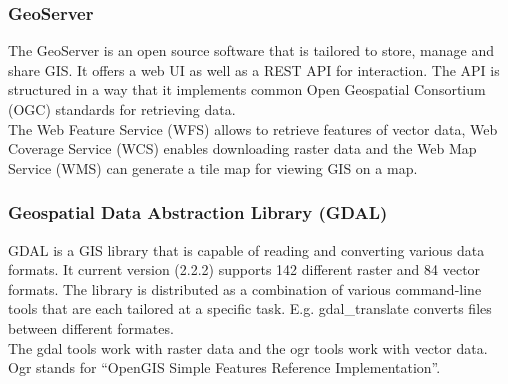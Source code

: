 \subsubsection{GeoServer} \label{sec:GS}
The GeoServer is an open source software that is tailored to store, manage and share GIS. It offers a web UI as well as a REST API for interaction. The API is structured in a way that it implements common Open Geospatial Consortium (OGC) standards for retrieving data.\\
The Web Feature Service (WFS) allows to retrieve features of vector data, Web Coverage Service (WCS) enables downloading raster data and the Web Map Service (WMS) can generate a tile map for viewing GIS on a map.
%

\subsubsection{Geospatial Data Abstraction Library (GDAL)}
\label{sec:gdal}
GDAL is a GIS library that is capable of reading and converting various data formats. It current version (2.2.2) supports 142 different raster and 84 vector formats. The library is distributed as a combination of various command-line tools that are each tailored at a specific task. E.g. gdal\_translate converts files between different formates.\\
The gdal tools work with raster data and the ogr tools work with vector data. Ogr stands for \enquote{OpenGIS Simple Features Reference Implementation}.


